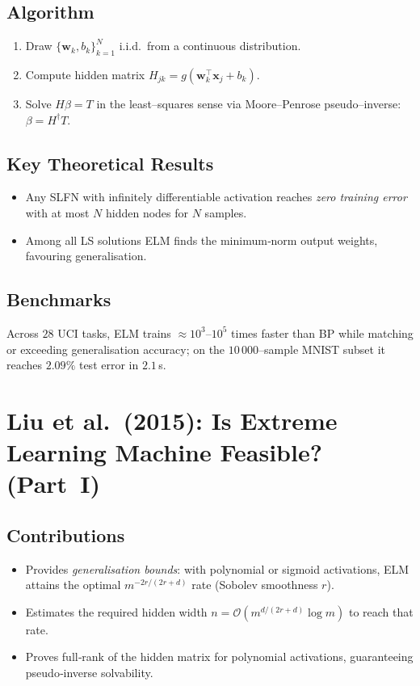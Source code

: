 \documentclass{article}
\begin{document}
\subsection*{Algorithm}
\begin{enumerate}
\item Draw $\{\boldsymbol w_k,b_k\}_{k=1}^N$ i.i.d.\ from a continuous distribution.
\item Compute hidden matrix $H_{jk}=g(\boldsymbol w_k^\top\boldsymbol x_j+b_k)$.
\item Solve $H\beta=T$ in the least–squares sense via Moore–Penrose pseudo–inverse: $\beta=H^{\dagger}T$.
\end{enumerate}

\subsection*{Key Theoretical Results}
\begin{itemize}
\item Any SLFN with infinitely differentiable activation reaches \emph{zero training error} with at most $N$ hidden nodes for $N$ samples.
\item Among all LS solutions ELM finds the minimum‑norm output weights, favouring generalisation.
\end{itemize}

\subsection*{Benchmarks}
Across $28$ UCI tasks, ELM trains $\approx10^3$–$10^5$ times faster than BP while matching or exceeding generalisation accuracy; on the $10\,000$–sample MNIST subset it reaches $2.09\%$ test error in $2.1$\,s.

\section{Liu et al.\ (2015): Is Extreme Learning Machine Feasible? (Part I)}
\subsection*{Contributions}
\begin{itemize}
\item Provides \emph{generalisation bounds}: with polynomial or sigmoid activations, ELM attains the optimal $m^{-2r/(2r+d)}$ rate (Sobolev smoothness $r$).
\item Estimates the required hidden width $n=\mathcal O(m^{d/(2r+d)}\log m)$ to reach that rate.
\item Proves full‑rank of the hidden matrix for polynomial activations, guaranteeing pseudo‑inverse solvability.
\end{itemize}
\end{document}

